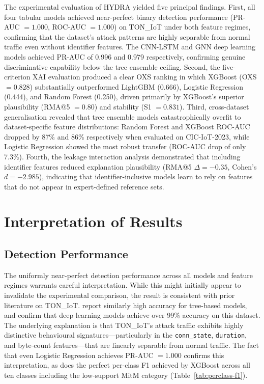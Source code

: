 \documentclass[12pt,a4paper]{report}
\begin{document}
The experimental evaluation of HYDRA yielded five principal findings. First, all four tabular models achieved near-perfect binary detection performance (PR-AUC $= 1.000$, ROC-AUC $= 1.000$) on TON\_IoT under both feature regimes, confirming that the dataset's attack patterns are highly separable from normal traffic even without identifier features. The CNN-LSTM and GNN deep learning models achieved PR-AUC of 0.996 and 0.979 respectively, confirming genuine discriminative capability below the tree ensemble ceiling. Second, the five-criterion XAI evaluation produced a clear OXS ranking in which XGBoost (OXS $= 0.828$) substantially outperformed LightGBM (0.666), Logistic Regression (0.444), and Random Forest (0.250), driven primarily by XGBoost's superior plausibility (RMA@5 $= 0.80$) and stability (S1 $= 0.831$). Third, cross-dataset generalisation revealed that tree ensemble models catastrophically overfit to dataset-specific feature distributions: Random Forest and XGBoost ROC-AUC dropped by 87\% and 86\% respectively when evaluated on CIC-IoT-2023, while Logistic Regression showed the most robust transfer (ROC-AUC drop of only 7.3\%). Fourth, the leakage interaction analysis demonstrated that including identifier features reduced explanation plausibility (RMA@5 $\Delta = -0.35$, Cohen's $d = -2.985$), indicating that identifier-inclusive models learn to rely on features that do not appear in expert-defined reference sets.

\section{Interpretation of Results}
\label{sec:interpretation}

\subsection*{Detection Performance}

The uniformly near-perfect detection performance across all models and feature regimes warrants careful interpretation. While this might initially appear to invalidate the experimental comparison, the result is consistent with prior literature on TON\_IoT. \citet{alsaedi2020} report similarly high accuracy for tree-based models, and \citet{ferrag2022} confirm that deep learning models achieve over 99\% accuracy on this dataset. The underlying explanation is that TON\_IoT's attack traffic exhibits highly distinctive behavioural signatures---particularly in the \texttt{conn\_state}, \texttt{duration}, and byte-count features---that are linearly separable from normal traffic. The fact that even Logistic Regression achieves PR-AUC $= 1.000$ confirms this interpretation, as does the perfect per-class F1 achieved by XGBoost across all ten classes including the low-support MitM category (Table~\ref{tab:perclass-f1}).
\end{document}
